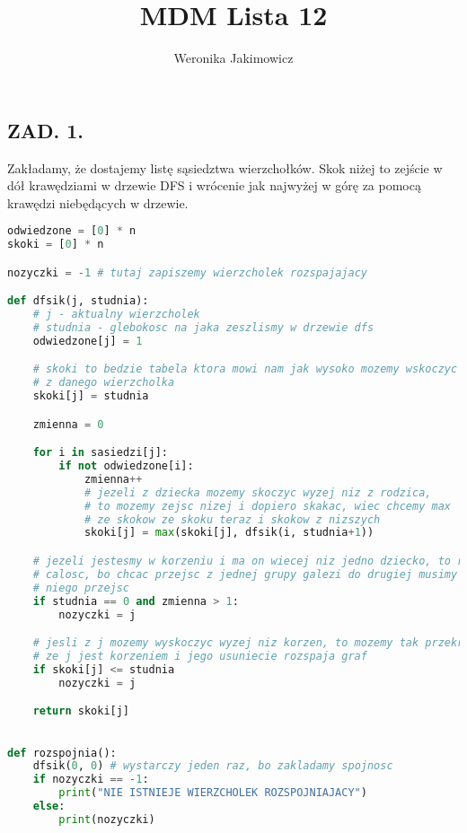 \documentclass{article}
\author{Weronika Jakimowicz}
\title{MDM Lista 12}
\date{}
\begin{document}
\maketitle
\thispagestyle{empty}

\subsection*{ZAD. 1.}

Zakładamy, że dostajemy listę sąsiedztwa wierzchołków. Skok niżej to zejście w dół krawędziami w drzewie DFS i wrócenie jak najwyżej w górę za pomocą krawędzi niebędących w drzewie.

\begin{lstlisting}[language=Python]
odwiedzone = [0] * n
skoki = [0] * n

nozyczki = -1 # tutaj zapiszemy wierzcholek rozspajajacy

def dfsik(j, studnia): 
    # j - aktualny wierzcholek
    # studnia - glebokosc na jaka zeszlismy w drzewie dfs
    odwiedzone[j] = 1

    # skoki to bedzie tabela ktora mowi nam jak wysoko mozemy wskoczyc 
    # z danego wierzcholka
    skoki[j] = studnia

    zmienna = 0

    for i in sasiedzi[j]:
        if not odwiedzone[i]:
            zmienna++
            # jezeli z dziecka mozemy skoczyc wyzej niz z rodzica, 
            # to mozemy zejsc nizej i dopiero skakac, wiec chcemy max
            # ze skokow ze skoku teraz i skokow z nizszych
            skoki[j] = max(skoki[j], dfsik(i, studnia+1))

    # jezeli jestesmy w korzeniu i ma on wiecej niz jedno dziecko, to rozspaja 
    # calosc, bo chcac przejsc z jednej grupy galezi do drugiej musimy przez 
    # niego przejsc
    if studnia == 0 and zmienna > 1:
        nozyczki = j

    # jesli z j mozemy wyskoczyc wyzej niz korzen, to mozemy tak przekrzywic graf, 
    # ze j jest korzeniem i jego usuniecie rozspaja graf
    if skoki[j] <= studnia
        nozyczki = j

    return skoki[j]
        

def rozspojnia():
    dfsik(0, 0) # wystarczy jeden raz, bo zakladamy spojnosc
    if nozyczki == -1:
        print("NIE ISTNIEJE WIERZCHOLEK ROZSPOJNIAJACY")
    else:
        print(nozyczki)
        


\end{lstlisting}
\newpage
\end{document}
